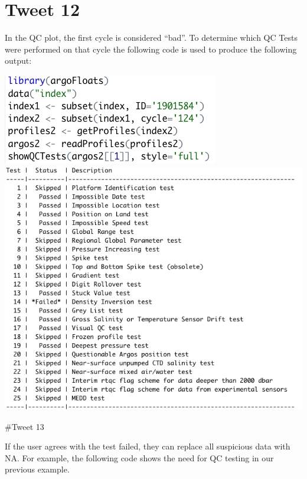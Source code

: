 \documentclass[
]{article}
\begin{document}
\hypertarget{tweet-12}{%
\section{Tweet 12}\label{tweet-12}}

In the QC plot, the first cycle is considered ``bad''. To determine
which QC Tests were performed on that cycle the following code is used
to produce the following output:

\includegraphics{../18_tweets/showQCTestsCode.png}
\includegraphics{../18_tweets/showQCTestOutput.png}

\#Tweet 13

If the user agrees with the test failed, they can replace all suspicious
data with NA. For example, the following code shows the need for QC
testing in our previous example.
\end{document}
